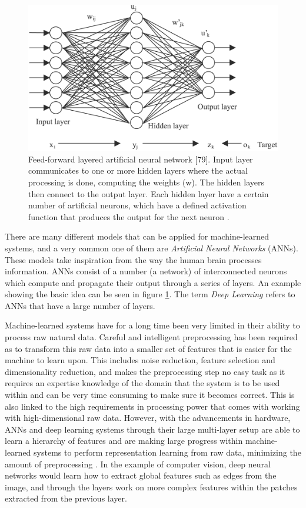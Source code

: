 \begin{figure}
	\centering
	\includegraphics[width=\textwidth]{img/related-work/ann.png}
	\caption{Feed-forward layered artificial neural network [79]. Input layer communicates to
one or more hidden layers where the actual processing is done, computing the weights (w). The
hidden layers then connect to the output layer. Each hidden layer have a certain number of
artificial neurons, which have a defined activation function that produces the output for the
next neuron \parencite{extremetech}.}
	\label{fig:rel_ann}
\end{figure}

There are many different models that can be applied for machine-learned systems, and a very common one of them are \emph{Artificial Neural Networks} (ANNs). These models take inspiration from the way the human brain processes information. ANNs consist of a number (a network) of interconnected neurons which compute and propagate their output through a series of layers. An example showing the basic idea can be seen in figure \ref{fig:rel_ann}. The term \emph{Deep Learning} refers to ANNs that have a large number of layers.

Machine-learned systems have for a long time been very limited in their ability to process raw natural data. Careful and intelligent preprocessing has been required as to transform this raw data into a smaller set of features that is easier for the machine to learn upon. This includes noise reduction, feature selection and dimensionality reduction, and makes the preprocessing step no easy task as it requires an expertise knowledge of the domain that the system is to be used within and can be very time consuming to make sure it becomes correct. This is also linked to the high requirements in processing power that comes with working with high-dimensional raw data. However, with the advancements in hardware, ANNs and deep learning systems through their large multi-layer setup are able to learn a hierarchy of features and are making large progress within machine-learned systems to perform representation learning from raw data, minimizing the amount of preprocessing \parencite{Lecun2015}. In the example of computer vision, deep neural networks would learn how to extract global features such as edges from the image, and through the layers work on more complex features within the patches extracted from the previous layer.

